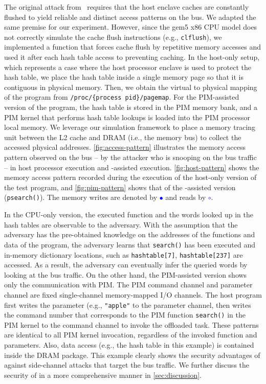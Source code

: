The original attack from~\cite{membuster} requires that the host enclave caches are constantly flushed to yield reliable and distinct access patterns on the bus. We adapted the same premise for our experiment. However, since the gem5 x86 CPU model does not correctly simulate the cache flush instructions (e.g., \texttt{clflush}), we implemented a function that forces cache flush by repetitive memory accesses and used it after each hash table access to preventing caching. In the host-only setup, which represents a case where the host processor enclave is used to protect the hash table, we place the hash table inside a single memory page so that it is contiguous in physical memory. Then, we obtain the virtual to physical mapping of the program from \texttt{/proc/\{process pid\}/pagemap}. For the PIM-assisted version of the program, the hash table is stored in the PIM memory bank, and a PIM kernel that performs hash table lookups is loaded into the PIM processor local memory. We leverage our simulation framework to place a memory tracing unit between the L2 cache and DRAM (i.e., the memory bus) to collect the accessed physical addresses. \autoref{fig:access-pattern} illustrates the memory access pattern observed on the bus -- by the attacker who is snooping on the bus traffic -- in host processor execution and \thename-assisted execution.
\autoref{fig:host-pattern} shows the memory access pattern recorded during the execution of the host-only version of the test program, and \autoref{fig:pim-pattern} shows that of the \thename-assisted version (\texttt{psearch()}). The memory writes are denoted by \textcolor{blue}{$\bullet$} and reads by \textcolor{blue}{$\circ$}. 

In the CPU-only version, the executed function and the words looked up in the hash tables are observable to the adversary. With the assumption that the adversary has the pre-obtained knowledge on the addresses of the functions and data of the program, the adversary learns that \texttt{search()} has been executed and in-memory dictionary locations, such as \texttt{hashtable[7]}, \texttt{hashtable[237]}  are accessed. As a result, the adversary can eventually infer the queried words by looking at the bus traffic. On the other hand, the PIM-assisted version shows only the communication with PIM. The PIM command channel and parameter channel are fixed single-channel memory-mapped I/O channels. The host program first writes the parameter (e.g., \texttt{"apple"} to the parameter channel, then writes the command number that corresponds to the PIM function \texttt{search()} in the PIM kernel to the command channel to invoke the offloaded task. These patterns are identical to all PIM kernel invocation, regardless of the invoked function and parameters. Also, data access (e.g., the hash table in this example) is contained inside the DRAM package. This example clearly shows the security advantages of \thename against side-channel attacks that target the bus traffic. We further discuss the security of \thename in a more comprehensive manner in \cref{sec:discussion}.







